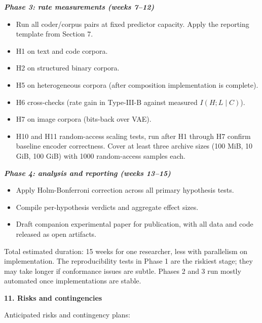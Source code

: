 \documentclass[
]{article}
\begin{document}
\emph{\textbf{Phase 3: rate measurements (weeks 7--12)}}

\begin{itemize}
\item
  Run all coder/corpus pairs at fixed predictor capacity. Apply the
  reporting template from Section 7.
\item
  H1 on text and code corpora.
\item
  H2 on structured binary corpora.
\item
  H5 on heterogeneous corpora (after composition implementation is
  complete).
\item
  H6 cross-checks (rate gain in Type-III-B against measured
  $I(H ; L \mid C)$).
\item
  H7 on image corpora (bits-back over VAE).
\item
  H10 and H11 random-access scaling tests, run after H1 through H7
  confirm baseline encoder correctness. Cover at least three archive
  sizes (100 MiB, 10 GiB, 100 GiB) with 1000 random-access samples each.
\end{itemize}

\emph{\textbf{Phase 4: analysis and reporting (weeks 13--15)}}

\begin{itemize}
\item
  Apply Holm-Bonferroni correction across all primary hypothesis tests.
\item
  Compile per-hypothesis verdicts and aggregate effect sizes.
\item
  Draft companion experimental paper for publication, with all data and
  code released as open artifacts.
\end{itemize}

Total estimated duration: 15 weeks for one researcher, less with
parallelism on implementation. The reproducibility tests in Phase 1 are
the riskiest stage; they may take longer if conformance issues are
subtle. Phases 2 and 3 run mostly automated once implementations are
stable.

\textbf{11. Risks and contingencies}

Anticipated risks and contingency plans:
\end{document}
